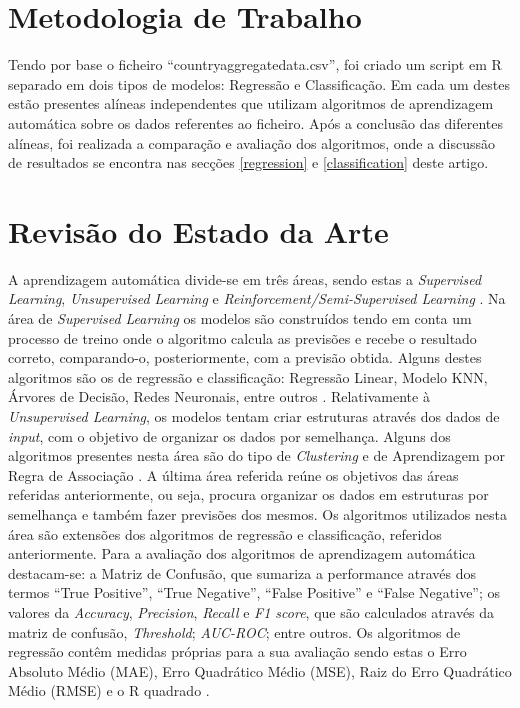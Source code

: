 \documentclass[conference]{IEEEtran}
\begin{document}
\section{Metodologia de Trabalho}
\label{methodology} %
Tendo por base o ficheiro “countryaggregatedata.csv”\cite{dataFile}, foi criado um script em R separado em dois tipos de modelos: Regressão e Classificação. Em cada um destes estão presentes alíneas independentes que utilizam algoritmos de aprendizagem automática sobre os dados referentes ao ficheiro. Após a conclusão das diferentes alíneas, foi realizada a comparação e avaliação dos algoritmos, onde a discussão de resultados se encontra nas secções \ref{regression} e \ref{classification} deste artigo. 



\section{Revisão do Estado da Arte} %
A aprendizagem automática divide-se em três áreas, sendo estas a \textit{Supervised Learning}, \textit{Unsupervised Learning} e \textit{Reinforcement/Semi-Supervised Learning} \cite{algorithms}.
Na área de \textit{Supervised Learning} os modelos são construídos tendo em conta um processo de treino onde o algoritmo calcula as previsões e recebe o resultado correto, comparando-o, posteriormente, com a previsão obtida. Alguns destes algoritmos são os de regressão e classificação: Regressão Linear, Modelo KNN, Árvores de Decisão, Redes Neuronais, entre outros \cite{regressionalgorithms}.
Relativamente à \textit{Unsupervised Learning}, os modelos tentam criar estruturas através dos dados de \textit{input}, com o objetivo de organizar os dados por semelhança. Alguns dos algoritmos presentes nesta área são do tipo de \textit{Clustering} \cite{clusteringalgorithms} e de Aprendizagem por Regra de Associação \cite{associationrulealgorithms}.
A última área referida reúne os objetivos das áreas referidas anteriormente, ou seja, procura organizar os dados em estruturas por semelhança e também fazer previsões dos mesmos. Os algoritmos utilizados nesta área são extensões dos algoritmos de regressão e classificação, referidos anteriormente.
Para a avaliação dos algoritmos de aprendizagem automática destacam-se: a Matriz de Confusão, que sumariza a performance através dos termos “True Positive”, “True Negative”, “False Positive” e “False Negative”; os valores da \textit{Accuracy}, \textit{Precision}, \textit{Recall} e \textit{F1 score}, que são calculados através da matriz de confusão, \textit{Threshold}; \textit{AUC-ROC}; entre outros. Os algoritmos de regressão contêm medidas próprias para a sua avaliação sendo estas o Erro Absoluto Médio (MAE), Erro Quadrático Médio (MSE), Raiz do Erro Quadrático Médio (RMSE) e o R quadrado \cite{evaluationmetrics}.
\end{document}
